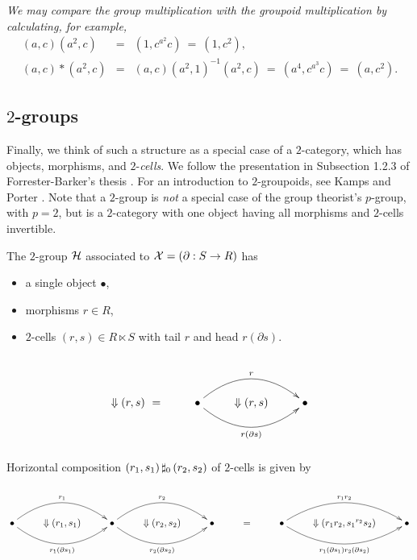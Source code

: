 \begin{example}
\begin{center}
\end{center}

\noindent
\emph{We may compare the group multiplication with the groupoid multiplication
by calculating, for example,}
\begin{eqnarray*}
(a,c)(a^2,c) &=& (1,c^{a^2}c) ~=~ (1,c^2), \\
(a,c)*(a^2,c)     &=& (a,c)(a^2,1)^{-1}(a^2,c) ~=~ (a^4,c^{a^3}c) ~=~ (a,c^2).
\end{eqnarray*}
\end{example}





\newpage
\subsection{$2$-groups} \label{subs:twogps}

Finally, we think of such a structure as a special case of a 
   
$2$-category, which has objects, morphisms, and $2$-\emph{cells}.
We follow the presentation in Subsection 1.2.3 of 
Forrester-Barker's thesis \cite{f-b-thesis}. 
For an introduction to $2$-groupoids, 
see Kamps and Porter \cite{kamps:port}.
Note that a $2$-group is \emph{not} a special case of the group theorist's 
$p$-group, with $p=2$, but is a $2$-category with one object having all 
morphisms and $2$-cells invertible.

The $2$-group $\mathcal{H}$ associated to $\mathcal{X} = (\partial : S \to R)$ has
\begin{itemize}
\item  a single object $\bullet$,
\item  morphisms $r \in R$,
\item  $2$-cells $(r,s) \in R \ltimes S$
       with tail $r$ and head $r(\partial s)$.
\end{itemize}
$$
\xy
\xymatrix{
   & & & \\
 \Downarrow (r,s)~= 
   & \bullet  \ar@/^5ex/[rr]^{r} 
              \ar@/_5ex/[rr]_{r(\partial s)} 
     & \Downarrow (r,s)
        & \bullet \\
   & & & \\
}
\endxy
$$

\noindent
Horizontal composition $(r_1,s_1) \,\sharp_0\, (r_2,s_2)$ 
of $2$-cells is given by
$$
\xy
\xymatrix{
  & &  & & & & & & \\
  \bullet \ar@/^5ex/[rr]^{r_1} 
          \ar@/_5ex/[rr]_{r_1(\partial s_1)} 
  & \Downarrow (r_1,s_1)
    & \bullet \ar@/^5ex/[rr]^{r_2} 
              \ar@/_5ex/[rr]_{r_2(\partial s_2)} 
      & \Downarrow (r_2,s_2)
        & \bullet 
          & = 
            & \bullet \ar@/^5ex/[rr]^{r_1r_2} 
                      \ar@/_5ex/[rr]_{r_1(\partial s_1)r_2(\partial s_2)} 
              & \Downarrow (r_1r_2,{s_1}^{r_2}{s_2})
                & \bullet \\
  & & & & & & & & \\
}
\endxy
$$

